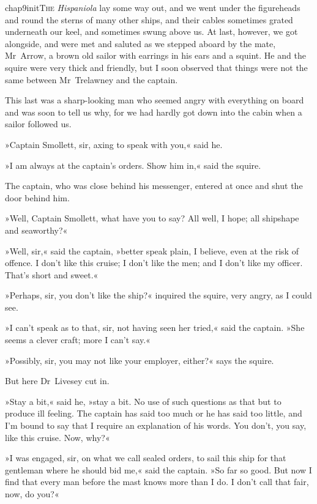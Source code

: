 
\lettrine[lines=5,image=true,findent=2pt]{chap9initT}{he} \textit{Hispaniola} lay some way out, and we went under the figureheads and round the sterns of many other ships, and their cables sometimes grated underneath our keel, and sometimes swung above us. At last, however, we got alongside, and were met and saluted as we stepped aboard by the mate, Mr~Arrow, a brown old sailor with earrings in his ears and a squint. He and the squire were very thick and friendly, but I soon observed that things were not the same between Mr~Trelawney and the captain.

This last was a sharp-looking man who seemed angry with everything on board and was soon to tell us why, for we had hardly got down into the cabin when a sailor followed us.

»Captain Smollett, sir, axing to speak with you,« said he.

»I am always at the captain's orders. Show him in,« said the squire.

The captain, who was close behind his messenger, entered at once and shut the door behind him.

»Well, Captain Smollett, what have you to say? All well, I hope; all shipshape and seaworthy?«

»Well, sir,« said the captain, »better speak plain, I believe, even at the risk of offence. I don't like this cruise; I don't like the men; and I don't like my officer. That's short and sweet.«

»Perhaps, sir, you don't like the ship?« inquired the squire, very angry, as I could see.

»I can't speak as to that, sir, not having seen her tried,« said the captain. »She seems a clever craft; more I can't say.«

»Possibly, sir, you may not like your employer, either?« says the squire.

But here Dr~Livesey cut in.

»Stay a bit,« said he, »stay a bit. No use of such questions as that but to produce ill feeling. The captain has said too much or he has said too little, and I'm bound to say that I require an explanation of his words. You don't, you say, like this cruise. Now, why?«

»I was engaged, sir, on what we call sealed orders, to sail this ship for that gentleman where he should bid me,« said the captain. »So far so good. But now I find that every man before the mast knows more than I do. I don't call that fair, now, do you?«

